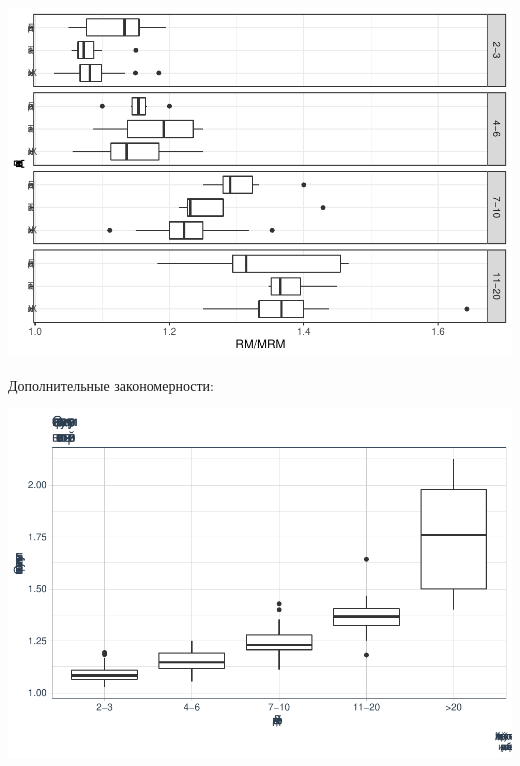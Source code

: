 \documentclass[
]{article}
\newenvironment{Shaded}{\begin{snugshade}}{\end{snugshade}}
\newcommand{\DataTypeTok}[1]{\textcolor[rgb]{0.13,0.29,0.53}{#1}}
\newcommand{\DecValTok}[1]{\textcolor[rgb]{0.00,0.00,0.81}{#1}}
\newcommand{\KeywordTok}[1]{\textcolor[rgb]{0.13,0.29,0.53}{\textbf{#1}}}
\newcommand{\NormalTok}[1]{#1}
\newcommand{\OperatorTok}[1]{\textcolor[rgb]{0.81,0.36,0.00}{\textbf{#1}}}
\newcommand{\StringTok}[1]{\textcolor[rgb]{0.31,0.60,0.02}{#1}}
\begin{document}
\begin{Shaded}
\end{Shaded}

\begin{center}\includegraphics[width=0.9\linewidth]{Regression-model-for-estimating-RM_files/figure-latex/unnamed-chunk-24-1} \end{center}

Дополнительные закономерности:

\begin{center}\includegraphics[width=0.85\linewidth]{Regression-model-for-estimating-RM_files/figure-latex/unnamed-chunk-25-1} \end{center}
\end{document}
